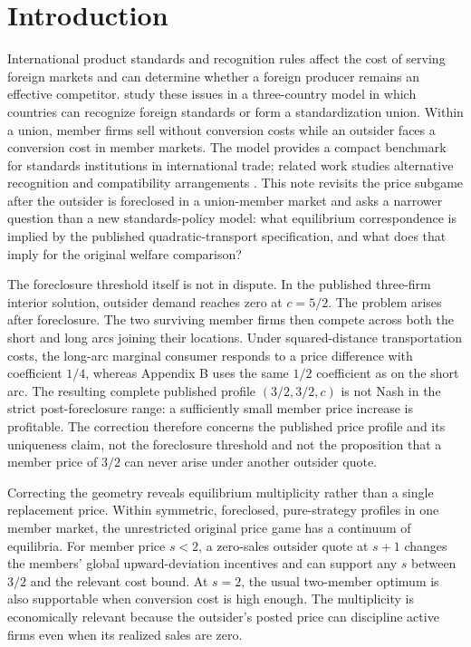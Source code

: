 \section{Introduction}\label{sec:intro}

International product standards and recognition rules affect the cost of serving foreign markets and can determine whether a foreign producer remains an effective competitor. \citet{gandalshy2001} study these issues in a three-country model in which countries can recognize foreign standards or form a standardization union. Within a union, member firms sell without conversion costs while an outsider faces a conversion cost in member markets. The model provides a compact benchmark for standards institutions in international trade; related work studies alternative recognition and compatibility arrangements \citep{costinot2008,klimenko2009}. This note revisits the price subgame after the outsider is foreclosed in a union-member market and asks a narrower question than a new standards-policy model: what equilibrium correspondence is implied by the published quadratic-transport specification, and what does that imply for the original welfare comparison?

The foreclosure threshold itself is not in dispute. In the published three-firm interior solution, outsider demand reaches zero at $c=5/2$. The problem arises after foreclosure. The two surviving member firms then compete across both the short and long arcs joining their locations. Under squared-distance transportation costs, the long-arc marginal consumer responds to a price difference with coefficient $1/4$, whereas Appendix B uses the same $1/2$ coefficient as on the short arc. The resulting complete published profile $(3/2,3/2,c)$ is not Nash in the strict post-foreclosure range: a sufficiently small member price increase is profitable. The correction therefore concerns the published price profile and its uniqueness claim, not the foreclosure threshold and not the proposition that a member price of $3/2$ can never arise under another outsider quote.

Correcting the geometry reveals equilibrium multiplicity rather than a single replacement price. Within symmetric, foreclosed, pure-strategy profiles in one member market, the unrestricted original price game has a continuum of equilibria. For member price $s<2$, a zero-sales outsider quote at $s+1$ changes the members' global upward-deviation incentives and can support any $s$ between $3/2$ and the relevant cost bound. At $s=2$, the usual two-member optimum is also supportable when conversion cost is high enough. The multiplicity is economically relevant because the outsider's posted price can discipline active firms even when its realized sales are zero.

